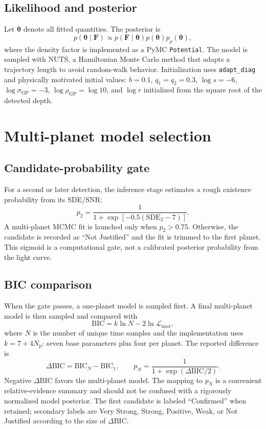 \documentclass[12pt,a4paper,oneside]{report}
\newcommand{\code}[1]{\texttt{\small #1}}
\begin{document}
\section{Likelihood and posterior}
Let \(\boldsymbol{\theta}\) denote all fitted quantities. The posterior is
\begin{equation}
  p(\boldsymbol{\theta}\mid\boldsymbol{F})
  \propto p(\boldsymbol{F}\mid\boldsymbol{\theta})
  p(\boldsymbol{\theta})p_{\rho}(\boldsymbol{\theta}),
\end{equation}
where the density factor is implemented as a PyMC \code{Potential}. The model
is sampled with NUTS, a Hamiltonian Monte Carlo method that adapts a trajectory
length to avoid random-walk behavior. Initialization uses \code{adapt\_diag}
and physically motivated initial values: \(b=0.1\), \(q_1=q_2=0.3\),
\(\log s=-6\), \(\log\sigma_{\mathrm{GP}}=-3\),
\(\log\rho_{\mathrm{GP}}=\log10\), and \(\log r\) initialized from the
square root of the detected depth.

\chapter{Multi-planet model selection}
\section{Candidate-probability gate}
For a second or later detection, the inference stage estimates a rough existence
probability from its SDE/SNR:
\begin{equation}
  p_2=\frac{1}{1+\exp[-0.5(\mathrm{SDE}_2-7)]}.
\end{equation}
A multi-planet MCMC fit is launched only when \(p_2>0.75\). Otherwise, the
candidate is recorded as ``Not Justified'' and the fit is trimmed to the first
planet. This sigmoid is a computational gate, not a calibrated posterior
probability from the light curve.

\section{BIC comparison}
When the gate passes, a one-planet model is sampled first. A final multi-planet
model is then sampled and compared with
\begin{equation}
  \mathrm{BIC}=k\ln N-2\ln\mathcal{L}_{\max},
\end{equation}
where \(N\) is the number of unique time samples and the implementation uses
\(k=7+4N_{\mathrm{p}}\): seven base parameters plus four per planet. The
reported difference is
\begin{equation}
  \Delta\mathrm{BIC}=\mathrm{BIC}_{N}-\mathrm{BIC}_{1},
  \qquad
  p_{N}=\frac{1}{1+\exp(\Delta\mathrm{BIC}/2)}.
\end{equation}
Negative \(\Delta\mathrm{BIC}\) favors the multi-planet model. The mapping to
\(p_N\) is a convenient relative-evidence summary and should not be confused
with a rigorously normalized model posterior. The first candidate is labeled
``Confirmed'' when retained; secondary labels are Very Strong, Strong, Positive,
Weak, or Not Justified according to the size of \(\Delta\mathrm{BIC}\).
\end{document}
